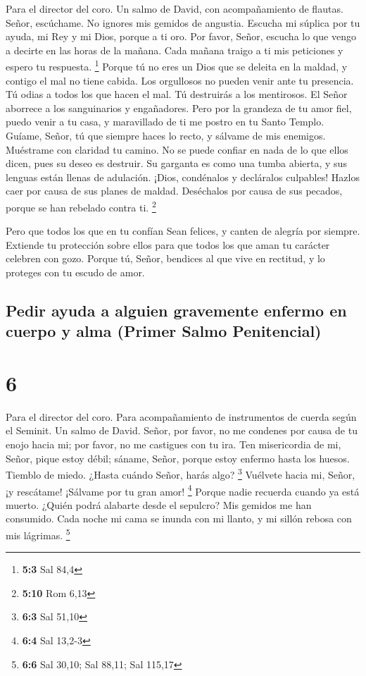 Para el director del coro. Un salmo de David, con acompañamiento de
flautas.  Señor, escúchame. No ignores mis gemidos de
angustia.  Escucha mi súplica por tu ayuda, mi Rey y mi
Dios, porque a ti oro.  Por favor, Señor, escucha lo que
vengo a decirte en las horas de la mañana. Cada mañana traigo a ti mis
peticiones y espero tu respuesta. \footnote{\textbf{5:3} Sal 84,4}
 Porque tú no eres un Dios que se deleita en la maldad, y
contigo el mal no tiene cabida.  Los orgullosos no pueden
venir ante tu presencia. Tú odias a todos los que hacen el mal.
 Tú destruirás a los mentirosos. El Señor aborrece a los
sanguinarios y engañadores.  Pero por la grandeza de tu amor
fiel, puedo venir a tu casa, y maravillado de ti me postro en tu Santo
Templo.  Guíame, Señor, tú que siempre haces lo recto, y
sálvame de mis enemigos. Muéstrame con claridad tu camino. 
No se puede confiar en nada de lo que ellos dicen, pues su deseo es
destruir. Su garganta es como una tumba abierta, y sus lenguas están
llenas de adulación.  ¡Dios, condénalos y decláralos
culpables! Hazlos caer por causa de sus planes de maldad. Deséchalos por
causa de sus pecados, porque se han rebelado contra ti. \footnote{\textbf{5:10}
  Rom 6,13}

 Pero que todos los que en tu confían Sean felices, y
canten de alegría por siempre. Extiende tu protección sobre ellos para
que todos los que aman tu carácter celebren con gozo. 
Porque tú, Señor, bendices al que vive en rectitud, y lo proteges con tu
escudo de amor.

\hypertarget{pedir-ayuda-a-alguien-gravemente-enfermo-en-cuerpo-y-alma-primer-salmo-penitencial}{%
\subsection{Pedir ayuda a alguien gravemente enfermo en cuerpo y alma
(Primer Salmo
Penitencial)}\label{pedir-ayuda-a-alguien-gravemente-enfermo-en-cuerpo-y-alma-primer-salmo-penitencial}}

\hypertarget{section-5}{%
\section{6}\label{section-5}}

Para el director del coro. Para acompañamiento de instrumentos de cuerda
según el Seminit. Un salmo de David.  Señor, por favor, no
me condenes por causa de tu enojo hacia mi; por favor, no me castigues
con tu ira.  Ten misericordia de mi, Señor, pique estoy
débil; sáname, Señor, porque estoy enfermo hasta los huesos.
 Tiemblo de miedo. ¿Hasta cuándo Señor, harás algo?
\footnote{\textbf{6:3} Sal 51,10}  Vuélvete hacia mi, Señor,
¡y rescátame! ¡Sálvame por tu gran amor! \footnote{\textbf{6:4} Sal
  13,2-3}  Porque nadie recuerda cuando ya está muerto.
¿Quién podrá alabarte desde el sepulcro?  Mis gemidos me han
consumido. Cada noche mi cama se inunda con mi llanto, y mi sillón
rebosa con mis lágrimas. \footnote{\textbf{6:6} Sal 30,10; Sal 88,11;
  Sal 115,17}

